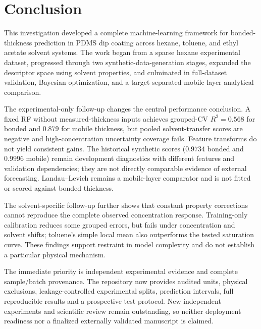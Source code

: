 \documentclass[11pt]{article}
\begin{document}
\section{Conclusion}
This investigation developed a complete machine-learning framework for bonded-thickness prediction in PDMS dip coating across hexane, toluene, and ethyl acetate solvent systems. The work began from a sparse hexane experimental dataset, progressed through two synthetic-data-generation stages, expanded the descriptor space using solvent properties, and culminated in full-dataset validation, Bayesian optimization, and a target-separated mobile-layer analytical comparison.

The experimental-only follow-up changes the central performance conclusion. A fixed RF without measured-thickness inputs achieves grouped-CV $R^2=0.568$ for bonded and $0.879$ for mobile thickness, but pooled solvent-transfer scores are negative and high-concentration uncertainty coverage fails. Feature transforms do not yield consistent gains. The historical synthetic scores ($0.9734$ bonded and $0.9996$ mobile) remain development diagnostics with different features and validation dependencies; they are not directly comparable evidence of external forecasting. Landau--Levich remains a mobile-layer comparator and is not fitted or scored against bonded thickness.

The solvent-specific follow-up further shows that constant property corrections cannot reproduce the complete observed concentration response. Training-only calibration reduces some grouped errors, but fails under concentration and solvent shifts; toluene's simple local mean also outperforms the tested saturation curve. These findings support restraint in model complexity and do not establish a particular physical mechanism.

The immediate priority is independent experimental evidence and complete sample/batch provenance. The repository now provides audited units, physical exclusions, leakage-controlled experimental splits, prediction intervals, full reproducible results and a prospective test protocol. New independent experiments and scientific review remain outstanding, so neither deployment readiness nor a finalized externally validated manuscript is claimed.
\end{document}
